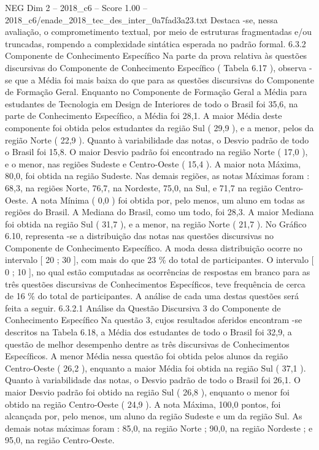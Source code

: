 \begin{textsample}{NEG Dim 2 – 2018\_c6 – Score 1.00 – 2018\_c6/enade\_2018\_tec\_des\_inter\_0a7fad3a23.txt}
Destaca -se, nessa avaliação, o comprometimento textual, por meio de estruturas fragmentadas e/ou truncadas, rompendo a complexidade sintática esperada no padrão formal. 6.3.2 Componente de Conhecimento Específico Na parte da prova relativa às questões discursivas do Componente de Conhecimento Específico ( Tabela 6.17 ), observa -se que a Média foi mais baixa do que para as questões discursivas do Componente de Formação Geral.
Enquanto no Componente de Formação Geral a Média para estudantes de Tecnologia em Design de Interiores de todo o Brasil foi 35,6, na parte de Conhecimento Específico, a Média foi 28,1.
A maior Média deste componente foi obtida pelos estudantes da região Sul ( 29,9 ), e a menor, pelos da região Norte ( 22,9 ).
Quanto à variabilidade das notas, o Desvio padrão de todo o Brasil foi 15,8.
O maior Desvio padrão foi encontrado na região Norte ( 17,0 ), e o menor, nas regiões Sudeste e Centro-Oeste ( 15,4 ).
A maior nota Máxima, 80,0, foi obtida na região Sudeste.
Nas demais regiões, as notas Máximas foram : 68,3, na regiões Norte, 76,7, na Nordeste, 75,0, na Sul, e 71,7 na região Centro-Oeste.
A nota Mínima ( 0,0 ) foi obtida por, pelo menos, um aluno em todas as regiões do Brasil.
A Mediana do Brasil, como um todo, foi 28,3.
A maior Mediana foi obtida na região Sul ( 31,7 ), e a menor, na região Norte ( 21,7 ).
No Gráfico 6.10, representa -se a distribuição das notas nas questões discursivas no Componente de Conhecimento Específico.
A moda dessa distribuição ocorre no intervalo [ 20 ; 30 ], com mais do que 23 \% do total de participantes.
O intervalo [ 0 ; 10 ], no qual estão computadas as ocorrências de respostas em branco para as três questões discursivas de Conhecimentos Específicos, teve frequência de cerca de 16 \% do total de participantes.
A análise de cada uma destas questões será feita a seguir. 6.3.2.1 Análise da Questão Discursiva 3 do Componente de Conhecimento Específico Na questão 3, cujos resultados aferidos encontram -se descritos na Tabela 6.18, a Média dos estudantes de todo o Brasil foi 32,9, a questão de melhor desempenho dentre as três discursivas de Conhecimentos Específicos.
A menor Média nessa questão foi obtida pelos alunos da região Centro-Oeste ( 26,2 ), enquanto a maior Média foi obtida na região Sul ( 37,1 ).
Quanto à variabilidade das notas, o Desvio padrão de todo o Brasil foi 26,1.
O maior Desvio padrão foi obtido na região Sul ( 26,8 ), enquanto o menor foi obtido na região Centro-Oeste ( 24,9 ).
A nota Máxima, 100,0 pontos, foi alcançada por, pelo menos, um aluno da região Sudeste e um da região Sul.
As demais notas máximas foram : 85,0, na região Norte ; 90,0, na região Nordeste ; e 95,0, na região Centro-Oeste.

\end{textsample}
